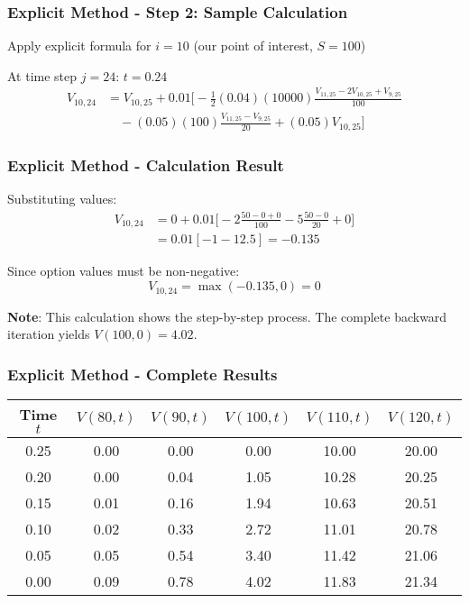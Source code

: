 \documentclass[aspectratio=169]{beamer}
\begin{document}
\begin{frame}
\frametitle{Explicit Method - Step 2: Sample Calculation}
Apply explicit formula for $i = 10$ (our point of interest, $S = 100$)

At time step $j = 24$: $t = 0.24$
\begin{align}
V_{10,24} &= V_{10,25} + 0.01 \bigg[ -\frac{1}{2}(0.04)(10000) \frac{V_{11,25} - 2V_{10,25} + V_{9,25}}{100} \\
&\quad - (0.05)(100) \frac{V_{11,25} - V_{9,25}}{20} + (0.05)V_{10,25} \bigg]
\end{align}
\end{frame}

\begin{frame}
\frametitle{Explicit Method - Calculation Result}
Substituting values:
\begin{align}
V_{10,24} &= 0 + 0.01 \bigg[ -2 \frac{50 - 0 + 0}{100} - 5 \frac{50 - 0}{20} + 0 \bigg] \\
&= 0.01[-1 - 12.5] = -0.135
\end{align}

Since option values must be non-negative: 
\[V_{10,24} = \max(-0.135, 0) = 0\]

\textbf{Note}: This calculation shows the step-by-step process. The complete backward iteration yields $V(100,0) = 4.02$.
\end{frame}

\begin{frame}
\frametitle{Explicit Method - Complete Results}
\begin{center}
\begin{tabular}{c|c|c|c|c|c}
Time $t$ & $V(80,t)$ & $V(90,t)$ & $V(100,t)$ & $V(110,t)$ & $V(120,t)$ \\
\hline
0.25 & 0.00 & 0.00 & 0.00 & 10.00 & 20.00 \\
0.20 & 0.00 & 0.04 & 1.05 & 10.28 & 20.25 \\
0.15 & 0.01 & 0.16 & 1.94 & 10.63 & 20.51 \\
0.10 & 0.02 & 0.33 & 2.72 & 11.01 & 20.78 \\
0.05 & 0.05 & 0.54 & 3.40 & 11.42 & 21.06 \\
0.00 & 0.09 & 0.78 & 4.02 & 11.83 & 21.34 \\
\end{tabular}
\end{center}
\end{frame}
\end{document}
